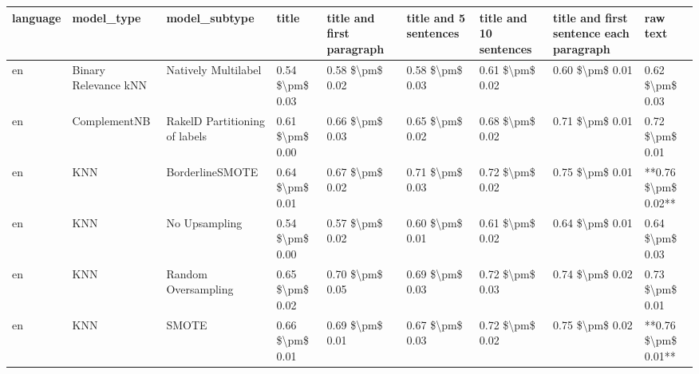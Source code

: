 \begin{tabular}{lllllllll}
\toprule
language &                      model\_type &                 model\_subtype &               title & title and first paragraph & title and 5 sentences & title and 10 sentences & title and first sentence each paragraph &            raw text \\
\midrule
      en &            Binary Relevance kNN &           Natively Multilabel &     0.54 \$\textbackslash pm\$ 0.03 &           0.58 \$\textbackslash pm\$ 0.02 &       0.58 \$\textbackslash pm\$ 0.03 &        0.61 \$\textbackslash pm\$ 0.02 &                         0.60 \$\textbackslash pm\$ 0.01 &     0.62 \$\textbackslash pm\$ 0.03 \\
      en &                    ComplementNB & RakelD Partitioning of labels &     0.61 \$\textbackslash pm\$ 0.00 &           0.66 \$\textbackslash pm\$ 0.03 &       0.65 \$\textbackslash pm\$ 0.02 &        0.68 \$\textbackslash pm\$ 0.02 &                         0.71 \$\textbackslash pm\$ 0.01 &     0.72 \$\textbackslash pm\$ 0.01 \\
      en &                             KNN &               BorderlineSMOTE &     0.64 \$\textbackslash pm\$ 0.01 &           0.67 \$\textbackslash pm\$ 0.02 &       0.71 \$\textbackslash pm\$ 0.03 &        0.72 \$\textbackslash pm\$ 0.02 &                         0.75 \$\textbackslash pm\$ 0.01 & **0.76 \$\textbackslash pm\$ 0.02** \\
      en &                             KNN &                 No Upsampling &     0.54 \$\textbackslash pm\$ 0.00 &           0.57 \$\textbackslash pm\$ 0.02 &       0.60 \$\textbackslash pm\$ 0.01 &        0.61 \$\textbackslash pm\$ 0.02 &                         0.64 \$\textbackslash pm\$ 0.01 &     0.64 \$\textbackslash pm\$ 0.03 \\
      en &                             KNN &           Random Oversampling &     0.65 \$\textbackslash pm\$ 0.02 &           0.70 \$\textbackslash pm\$ 0.05 &       0.69 \$\textbackslash pm\$ 0.03 &        0.72 \$\textbackslash pm\$ 0.03 &                         0.74 \$\textbackslash pm\$ 0.02 &     0.73 \$\textbackslash pm\$ 0.01 \\
      en &                             KNN &                         SMOTE &     0.66 \$\textbackslash pm\$ 0.01 &           0.69 \$\textbackslash pm\$ 0.01 &       0.67 \$\textbackslash pm\$ 0.03 &        0.72 \$\textbackslash pm\$ 0.02 &                         0.75 \$\textbackslash pm\$ 0.02 & **0.76 \$\textbackslash pm\$ 0.01** \\

\end{tabular}
